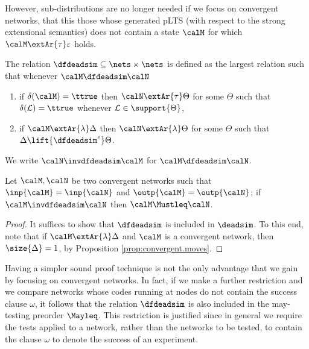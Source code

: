 \documentclass{LMCS}
\newcommand{\calL}{\ensuremath{{\mathcal{L}}}}
\begin{document}
However, sub-distributions are no longer needed if we 
focus on convergent networks, that this those whose 
generated pLTS (with respect to the strong extensional semantics) 
does not contain a state $\calM$ for which $\calM \extAr{\tau} \varepsilon$ 
holds. 

\begin{defi}
\label{def:dfdeadsim}
The relation $\dfdeadsim \subseteq \nets \times \nets$ is defined 
as the largest relation such that whenever 
$\calM \dfdeadsim \calN$
\begin{enumerate}[label=(\roman*)]
\item if $\delta(\calM) = \ttrue$ then $\calN \extAr{\tau} \Theta$ 
for some $\Theta$ such that $\delta(\calL) = \ttrue$ whenever 
$\calL \in \support{\Theta}$,
\item if $\calM \extAr{\lambda} \Delta$ then 
$\calN \extAr{\lambda} \Theta$ for some $\Theta$ 
such that $\Delta \lift{\dfdeadsim^e} \Theta$.
\end{enumerate}
\end{defi}

\noindent We write $\calN \invdfdeadsim \calM$ for $\calM \dfdeadsim \calN$. 

\begin{thm}
\label{thm:must.dfsound}
Let $\calM, \calN$ be two convergent 
networks such that $\inp{\calM} = \inp{\calN}$ 
and $\outp{\calM} = \outp{\calN}$; if $\calM \invdfdeadsim \calN$ then 
$\calM \Mustleq \calN$.
\end{thm}

\begin{proof}
It suffices to show that $\dfdeadsim$ is included in 
$\deadsim$. To this end, note that if 
$\calM \extAr{\lambda} \Delta$ and $\calM$ is a convergent 
network, then $\size{\Delta} = 1$, by Proposition 
\ref{prop:convergent.moves}.
\end{proof}

Having a simpler sound proof technique is not the only 
advantage that we gain by focusing on convergent networks. 
In fact, if we make a further restriction and we compare networks 
whose codes running at nodes do not contain the success clause 
$\omega$, it follows that the relation $\dfdeadsim$ is also included 
in the may-testing preorder $\Mayleq$. This restriction is justified 
since in general we require the tests applied to a network, 
rather than the networks to be tested, to contain the clause 
$\omega$ to denote the success of an experiment. 
\end{document}
